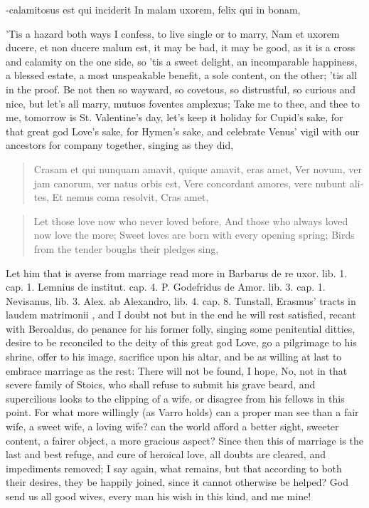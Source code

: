 -calamitosus est qui inciderit
In malam uxorem, felix qui in bonam,

'Tis a hazard both ways I confess, to live single or to marry,
Nam et uxorem ducere, et non ducere malum est, it may be bad, it
may be good, as it is a cross and calamity on the one side, so 'tis a
sweet delight, an incomparable happiness, a blessed estate, a most
unspeakable benefit, a sole content, on the other; 'tis all in the
proof. Be not then so wayward, so covetous, so distrustful, so curious
and nice, but let's all marry, mutuos foventes amplexus; Take me to
thee, and thee to me, tomorrow is St. Valentine's day, let's keep it
holiday for Cupid's sake, for that great god Love's sake, for Hymen's
sake, and celebrate Venus' vigil with our ancestors for company
together, singing as they did,

\begin{latin}
\begin{verse}
Crasam et qui nunquam amavit, quique amavit, eras amet,
Ver novum, ver jam canorum, ver natus orbis est,
Vere concordant amores, vere nubunt alites,
Et nemus coma resolvit,
Cras amet,
\end{verse}
\end{latin}
\translationrule%
\begin{verse}%
Let those love now who never loved before,
And those who always loved now love the more;
Sweet loves are born with every opening spring;
Birds from the tender boughs their pledges sing,
\end{verse}%

Let him that is averse from marriage read more in Barbarus de re uxor.
lib. 1. cap. 1. Lemnius de institut. cap. 4. P. Godefridus de Amor.
lib. 3. cap. 1. Nevisanus, lib. 3. Alex. ab Alexandro, lib. 4.
cap. 8. Tunstall, Erasmus' tracts in laudem matrimonii \etc{}, and I doubt
not but in the end he will rest satisfied, recant with Beroaldus, do
penance for his former folly, singing some penitential ditties, desire
to be reconciled to the deity of this great god Love, go a pilgrimage
to his shrine, offer to his image, sacrifice upon his altar, and be as
willing at last to embrace marriage as the rest: There will not be
found, I hope, No, not in that severe family of Stoics, who shall
refuse to submit his grave beard, and supercilious looks to the
clipping of a wife, or disagree from his fellows in this point. For
what more willingly (as Varro holds) can a proper man see than a
fair wife, a sweet wife, a loving wife? can the world afford a better
sight, sweeter content, a fairer object, a more gracious aspect?
Since then this of marriage is the last and best refuge, and cure of
heroical love, all doubts are cleared, and impediments removed; I say
again, what remains, but that according to both their desires, they be
happily joined, since it cannot otherwise be helped? God send us all
good wives, every man his wish in this kind, and me mine!


